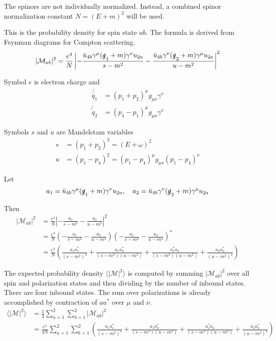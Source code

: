 \documentclass[12pt]{article}
\begin{document}
The spinors are not individually normalized.
Instead, a combined spinor normalization constant $N=(E+m)^2$ will be used.

\bigskip
This is the probability density for spin state $ab$.
The formula is derived from Feynman diagrams for Compton scattering.
\begin{equation*}
|\mathcal{M}_{ab}|^2
=
\frac{e^4}{N}
\left|
-\frac{\bar{u}_{4b}\gamma^\mu(\slashed{q}_1+m)\gamma^\nu u_{2a}}{s-m^2}
-\frac{\bar{u}_{4b}\gamma^\nu(\slashed{q}_2+m)\gamma^\mu u_{2a}}{u-m^2}
\right|^2
\end{equation*}

Symbol $e$ is electron charge and
\begin{align*}
\not{\!q_1}&=(p_1+p_2)^\mu g_{\mu\nu}\gamma^\nu
\\
\not{\!q}_2&=(p_4-p_1)^\mu g_{\mu\nu}\gamma^\nu
\end{align*}

Symbols $s$ and $u$ are Mandelstam variables
\begin{align*}
s&=(p_1+p_2)^2=(E+\omega)^2
\\
u&=(p_1-p_4)^2=(p_1-p_4)^\mu g_{\mu\nu} (p_1-p_4)^\nu
\end{align*}

Let
\begin{equation*}
a_1=\bar{u}_{4b}\gamma^\mu(\slashed{q}_1+m)\gamma^\nu u_{2a},
\quad
a_2=\bar{u}_{4b}\gamma^\nu(\slashed{q}_2+m)\gamma^\mu u_{2a}
\end{equation*}

Then
\begin{align*}
|\mathcal{M}_{ab}|^2&=\frac{e^4}{N}\left|-\frac{a_1}{s-m^2}-\frac{a_2}{u-m^2}\right|^2\\
&=
\frac{e^4}{N}
\left(-\frac{a_1}{s-m^2}-\frac{a_2}{u-m^2}\right)
\left(-\frac{a_1}{s-m^2}-\frac{a_2}{u-m^2}\right)^*\\
&=
\frac{e^4}{N}\left(
\frac{a_1a_1^*}{(s-m^2)^2}
+\frac{a_1a_2^*}{(s-m^2)(u-m^2)}
+\frac{a_1^*a_2}{(s-m^2)(u-m^2)}
+\frac{a_2a_2^*}{(u-m^2)^2}
\right)
\end{align*}

The expected probability density $\langle|\mathcal{M}|^2\rangle$ is
computed by summing $|\mathcal{M}_{ab}|^2$ over all spin and polarization states
and then dividing by the number of inbound states.
There are four inbound states.
The sum over polarizations is already accomplished by contraction of $aa^*$ over $\mu$ and $\nu$.
\begin{align*}
\langle|\mathcal{M}|^2\rangle
&=\frac{1}{4}\sum_{a=1}^2\sum_{b=1}^2|\mathcal{M}_{ab}|^2
\\
&=\frac{e^4}{4N}\sum_{a=1}^2\sum_{b=1}^2
\left(
\frac{a_1a_1^*}{(s-m^2)^2}
+\frac{a_1a_2^*}{(s-m^2)(u-m^2)}
+\frac{a_1^*a_2}{(s-m^2)(u-m^2)}
+\frac{a_2a_2^*}{(u-m^2)^2}
\right)
\end{align*}
\end{document}
